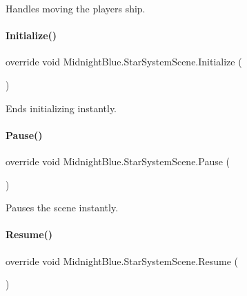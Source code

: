 Handles moving the players ship. 

\hypertarget{class_midnight_blue_1_1_star_system_scene_a1b593cd45d0f1b6c02f17ec5dd1033ca}{}\label{class_midnight_blue_1_1_star_system_scene_a1b593cd45d0f1b6c02f17ec5dd1033ca} 
\paragraph{\texorpdfstring{Initialize()}{Initialize()}}
{\footnotesize\ttfamily override void Midnight\+Blue.\+Star\+System\+Scene.\+Initialize (\begin{DoxyParamCaption}{ }\end{DoxyParamCaption})\hspace{0.3cm}{\ttfamily [inline]}}



Ends initializing instantly. 

\hypertarget{class_midnight_blue_1_1_star_system_scene_a04e8bfcb31eebfd859c4bd543f0bb6f9}{}\label{class_midnight_blue_1_1_star_system_scene_a04e8bfcb31eebfd859c4bd543f0bb6f9} 
\paragraph{\texorpdfstring{Pause()}{Pause()}}
{\footnotesize\ttfamily override void Midnight\+Blue.\+Star\+System\+Scene.\+Pause (\begin{DoxyParamCaption}{ }\end{DoxyParamCaption})\hspace{0.3cm}{\ttfamily [inline]}}



Pauses the scene instantly. 

\hypertarget{class_midnight_blue_1_1_star_system_scene_aefbf0750a7ce153b923bcabb132e4875}{}\label{class_midnight_blue_1_1_star_system_scene_aefbf0750a7ce153b923bcabb132e4875} 
\paragraph{\texorpdfstring{Resume()}{Resume()}}
{\footnotesize\ttfamily override void Midnight\+Blue.\+Star\+System\+Scene.\+Resume (\begin{DoxyParamCaption}{ }\end{DoxyParamCaption})\hspace{0.3cm}{\ttfamily [inline]}}



